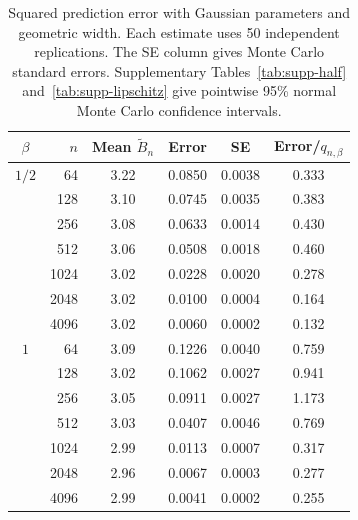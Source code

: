 \begin{table}[t]
\caption{Squared prediction error with Gaussian parameters and geometric width. Each estimate uses 50 independent replications. The SE column gives Monte Carlo standard errors. Supplementary Tables~\ref{tab:supp-half} and~\ref{tab:supp-lipschitz} give pointwise 95\% normal Monte Carlo confidence intervals.}
\label{tab:simulation-adaptive-risk}
\centering\small
\begin{tabular}{@{}crcccc@{}}
\toprule
$\beta$ & $n$ & Mean $\widetilde B_n$ & Error & SE & Error/$q_{n,\beta}$\\
\midrule
$1/2$ & 64 & 3.22 & 0.0850 & 0.0038 & 0.333\\
 & 128 & 3.10 & 0.0745 & 0.0035 & 0.383\\
 & 256 & 3.08 & 0.0633 & 0.0014 & 0.430\\
 & 512 & 3.06 & 0.0508 & 0.0018 & 0.460\\
 & 1024 & 3.02 & 0.0228 & 0.0020 & 0.278\\
 & 2048 & 3.02 & 0.0100 & 0.0004 & 0.164\\
 & 4096 & 3.02 & 0.0060 & 0.0002 & 0.132\\
\midrule
$1$ & 64 & 3.09 & 0.1226 & 0.0040 & 0.759\\
 & 128 & 3.02 & 0.1062 & 0.0027 & 0.941\\
 & 256 & 3.05 & 0.0911 & 0.0027 & 1.173\\
 & 512 & 3.03 & 0.0407 & 0.0046 & 0.769\\
 & 1024 & 2.99 & 0.0113 & 0.0007 & 0.317\\
 & 2048 & 2.96 & 0.0067 & 0.0003 & 0.277\\
 & 4096 & 2.99 & 0.0041 & 0.0002 & 0.255\\
\bottomrule
\end{tabular}
\end{table}
